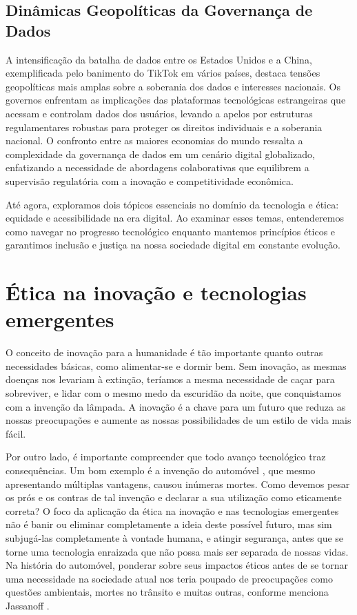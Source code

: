 \documentclass[referee,sn-basic]{sn-jnl}
\theoremstyle{thmstyleone}%
\begin{document}
\subsection{Dinâmicas Geopolíticas da Governança de Dados}

\hspace{0.7cm}A intensificação da batalha de dados entre os Estados Unidos e a China, exemplificada pelo banimento do TikTok em vários países, destaca tensões geopolíticas mais amplas sobre a soberania dos dados e interesses nacionais. Os governos enfrentam as implicações das plataformas tecnológicas estrangeiras que acessam e controlam dados dos usuários, levando a apelos por estruturas regulamentares robustas para proteger os direitos individuais e a soberania nacional. O confronto entre as maiores economias do mundo ressalta a complexidade da governança de dados em um cenário digital globalizado, enfatizando a necessidade de abordagens colaborativas que equilibrem a supervisão regulatória com a inovação e competitividade econômica.\par

Até agora, exploramos dois tópicos essenciais no domínio da tecnologia e ética: equidade e acessibilidade na era digital. Ao examinar esses temas, entenderemos como navegar no progresso tecnológico enquanto mantemos princípios éticos e garantimos inclusão e justiça na nossa sociedade digital em constante evolução.

\section{Ética na inovação e tecnologias emergentes}

\hspace{0.7cm}O conceito de inovação para a humanidade é tão importante quanto outras necessidades básicas, como alimentar-se e dormir bem. Sem inovação, as mesmas doenças nos levariam à extinção, teríamos a mesma necessidade de caçar para sobreviver, e lidar com o mesmo medo da escuridão da noite, que conquistamos com a invenção da lâmpada. A inovação é a chave para um futuro que reduza as nossas preocupações e aumente as nossas possibilidades de um estilo de vida mais fácil.\par

Por outro lado, é importante compreender que todo avanço tecnológico traz consequências. Um bom exemplo é a invenção do automóvel \cite{ethicsinvention}, que mesmo apresentando múltiplas vantagens, causou inúmeras mortes. Como devemos pesar os prós e os contras de tal invenção e declarar a sua utilização como eticamente correta? O foco da aplicação da ética na inovação e nas tecnologias emergentes não é banir ou eliminar completamente a ideia deste possível futuro, mas sim subjugá-las completamente à vontade humana, e atingir segurança, antes que se torne uma tecnologia enraizada que não possa mais ser separada de nossas vidas. Na história do automóvel, ponderar sobre seus impactos éticos antes de se tornar uma necessidade na sociedade atual nos teria poupado de preocupações como questões ambientais, mortes no trânsito e muitas outras, conforme menciona Jassanoff \cite{ethicsinvention}.\par
\end{document}
